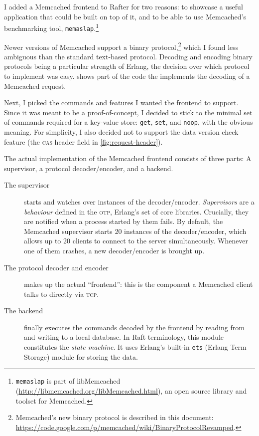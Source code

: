 \documentclass[11pt,chapterprefix=true,toc=bibliography,numbers=noendperiod,
               footnotes=multiple,twoside]{scrreprt}
\begin{document}
I added a Memcached frontend to Rafter for two reasons: to showcase a useful application that could be built on top of it, and to be able to use Memcached's benchmarking tool, \texttt{memaslap}.\footnote{\texttt{memaslap} is part of libMemcached (\url{http://libmemcached.org/libMemcached.html}), an open source library and toolset for Memcached.}

Newer versions of Memcached support a binary protocol,\footnote{Memcached's new binary protocol is described in this document: \url{https://code.google.com/p/memcached/wiki/BinaryProtocolRevamped}.} which I found less ambiguous than the standard text-based protocol. Decoding and encoding binary protocols being a particular strength of Erlang, the decision over which protocol to implement was easy.  shows part of the code the implements the decoding of a Memcached request.

Next, I picked the commands and features I wanted the frontend to support. Since it was meant to be a proof-of-concept, I decided to stick to the minimal set of commands required for a key-value store: \texttt{get}, \texttt{set}, and \texttt{noop}, with the obvious meaning. For simplicity, I also decided not to support the data version check feature (the \textsc{cas} header field in \cref{fig:request-header}).


The actual implementation of the Memcached frontend consists of three parts: A supervisor, a protocol decoder/encoder, and a backend.

\begin{description}
    \item[The supervisor] starts and watches over instances of the decoder/encoder. \emph{Supervisors} are a \emph{behaviour} defined in the \textsc{otp}, Erlang's set of core libraries. Crucially, they are notified when a process started by them fails. By default, the Memcached supervisor starts 20 instances of the decoder/encoder, which allows up to 20 clients to connect to the server simultaneously. Whenever one of them crashes, a new decoder/encoder is brought up.
    \item[The protocol decoder and encoder] makes up the actual \enquote{frontend}: this is the component a Memcached client talks to directly via \textsc{tcp}.
    \item[The backend] finally executes the commands decoded by the frontend by reading from and writing to a local database. In Raft terminology, this module constitutes the \emph{state machine}. It uses Erlang's built-in \texttt{ets} (Erlang Term Storage) module for storing the data.
\end{description}
\end{document}
